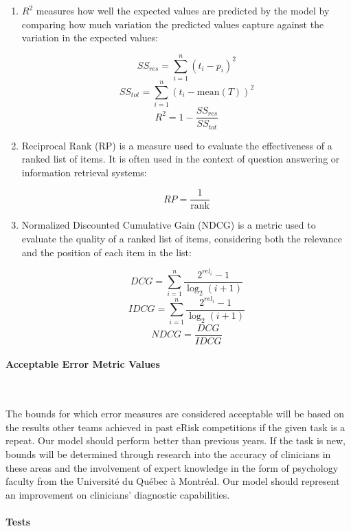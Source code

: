 \documentclass[12pt, titlepage]{article}
\newcommand{\myparagraph}[1]{\paragraph{#1}\mbox{}\\}
\begin{document}
\begin{enumerate}
\item{$R^2$} measures how well the expected values are predicted by the model by comparing how much variation the predicted values capture against the variation in the expected values:

$$SS_{res} = \sum_{i=1}^{n} (t_i - p_i)^2$$
$$SS_{tot} = \sum_{i=1}^{n} (t_i - \text{mean}(T))^2$$
$$R^2 = 1 - \frac{SS_{res}}{SS_{tot}}$$

\item{Reciprocal Rank (RP)} is a measure used to evaluate the effectiveness of a ranked list of items. It is often used in the context of question answering or information retrieval systems:

$$RP = \frac{1}{\text{rank}}$$

\item{Normalized Discounted Cumulative Gain (NDCG)} is a metric used to evaluate the quality of a ranked list of items, considering both the relevance and the position of each item in the list:

$$DCG = \sum_{i=1}^{n} \frac{2^{rel_i} - 1}{\log_2(i + 1)}$$
$$IDCG = \sum_{i=1}^{n} \frac{2^{rel_i} - 1}{\log_2(i + 1)}$$
$$NDCG = \frac{DCG}{IDCG}$$



\end{enumerate}

\myparagraph{Acceptable Error Metric Values} \label{bounds}

The bounds for which error measures are considered acceptable will be based on the results other teams achieved in past eRisk competitions if the given task is a repeat. Our model should perform better than previous years. If the task is new, bounds will be determined through research into the accuracy of clinicians in these areas and the involvement of expert knowledge in the form of psychology faculty from the Université du Québec à Montréal. Our model should represent an improvement on clinicians’ diagnostic capabilities.

\myparagraph{Tests}
\end{document}
